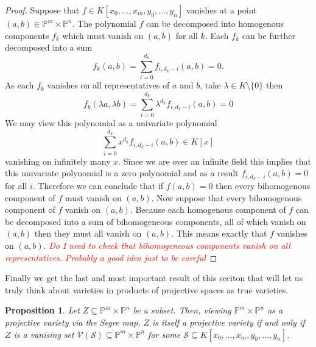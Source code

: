 \documentclass[40pt]{article}
\newcommand{\mcal}[1]{\mathcal{#1}}
\newcommand{\Proj}{\mathbb{P}}
\newcommand{\V}{\mathcal{V}}
\newcommand{\note}[1]{\textcolor{red}{\emph{#1}}}
\newtheorem{proposition}{Proposition}[section]
\theoremstyle{remark}
\begin{document}
			\begin{proof}
				Suppose that $f \in K[x_0,\dots,x_m,y_0,\dots,y_n]$ vanishes at a point $(a,b)\in \Proj^m \times \Proj^n$. The polynomial $f$ can be decomposed into homogenous components $f_k$ which must vanish on $(a,b)$ for all $k$. Each $f_k$ can be further decomposed into a sum
				\[
				f_k(a,b) = \sum_{i=0}^{d_k} f_{i,d_k - i}(a,b) = 0.
				\]
				As each $f_k$ vanishes on all representatives of $a$ and $b$, take $\lambda \in K\setminus \{0\}$ then 
				\[
				f_k(\lambda a, \lambda b) = \sum_{i=0}^{d_k}\lambda^{d_k}f_{i,d_k-i}(a,b) = 0
				\]
				We may view this polynomial as a univariate polynomial 
				\[
				\sum_{i=0}^{d_k}x^{d_k}f_{i,d_k-i}(a,b) \in K[x]
				\]
				vanishing on infinitely many $x$. Since we are over an infinite field this implies that this univariate polynomial is a zero polynomial and as a result $f_{i,d_k-i}(a,b) = 0$ for all $i$. Therefore we can conclude that if $f(a,b) = 0$ then every bihomogenous component of $f$ must vanish on $(a,b)$. Now suppose that every bihomogenous component of $f$  vanish on $(a,b)$. Because each homogenous component of $f$ can be decomposed into a sum of bihomogeneous components, all of which vanish on $(a,b)$ then they must all vanish on $(a,b)$. This means exactly that $f$ vanishes on $(a,b)$. \note{Do I need to check that bihomogeneous components vanish on all representatives. Probably a good idea just to be careful} 
			\end{proof}
			Finally we get the last and most important result of this seciton that will let us truly think about varieties in products of projective spaces as true varieties.
			\begin{proposition}
				Let $Z \subseteq \Proj^m \times \Proj^n$ be a subset. Then, viewing $\Proj^m \times \Proj^n$ as a projective variety via the Segre map, $Z$ is itself a projective variety if and only if $Z$ is a vanising set $\V(\mcal{S}) \subseteq \Proj^m \times \Proj^n$ for some $\mcal{S} \subseteq K[x_0,\dots,x_m, y_0,\dots,y_n]$. 
				\end{proposition}
\end{document}
